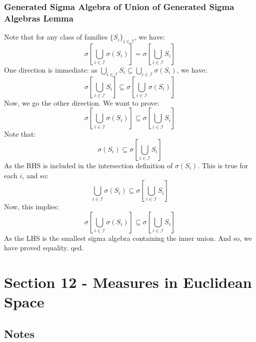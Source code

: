 \documentclass[12pt,a4paper]{article}
\newcommand{\1}[1]{\mathbbm{1}\left\{ #1 \right\}}
\newcommand{\ical}{\mathcal{I}}
\begin{document}
\subsubsection{Generated Sigma Algebra of Union of Generated Sigma Algebras Lemma} Note that for any class of families $\{S_i\}_{i \in \ical}$, we have:
$$
	\sigma\left[\bigcup_{i \in \ical} \sigma(S_i)\right] =
	\sigma\left[\bigcup_{i \in \ical} S_i\right]
$$
One direction is immediate: as $\bigcup_{i \in \ical} S_i \subseteq \bigcup_{i \in \ical} \sigma(S_i)$, we have:
$$
	\sigma\left[\bigcup_{i \in \ical} S_i\right] \subseteq \sigma\left[\bigcup_{i \in \ical} \sigma(S_i)\right]
$$
Now, we go the other direction. We want to prove:
$$
	\sigma\left[\bigcup_{i \in \ical} \sigma(S_i)\right] \subseteq
	\sigma\left[\bigcup_{i \in \ical} S_i\right]
$$
Note that:
$$
	\sigma(S_i) \subseteq \sigma\left[\bigcup_{i \in \ical} S_i\right]
$$
As the RHS is included in the intersection definition of $\sigma(S_i)$. This is true for each $i$, and so:
$$
	\bigcup_{i \in \ical} \sigma(S_i) \subseteq \sigma\left[\bigcup_{i \in \ical} S_i\right]
$$
Now, this implies:
$$
	\sigma\left[\bigcup_{i \in \ical} \sigma(S_i)\right] \subseteq
	\sigma\left[\bigcup_{i \in \ical} S_i\right]
$$
As the LHS is the smallest sigma algebra containing the inner union. And so, we have proved equality. qed.

\section{Section 12 - Measures in Euclidean Space}
\subsection{Notes}
\end{document}
